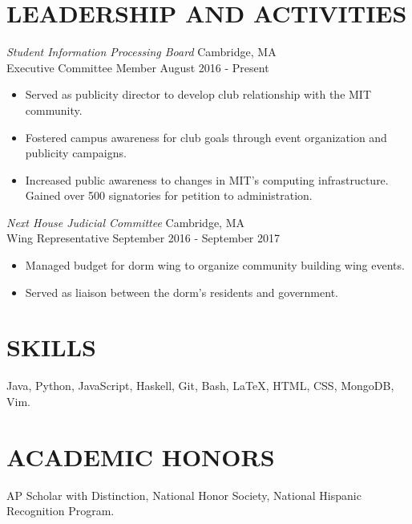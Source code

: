 \documentclass[8pt]{res}
\begin{document}
\vspace{-1em}

\section{LEADERSHIP AND ACTIVITIES}
  {\sl Student Information Processing Board}                 \hfill  Cambridge, MA\\
  Executive Committee Member                                 \hfill  August 2016 - Present
    \begin{itemize}  %
      \item Served as publicity director to develop club relationship with the MIT community.
      \item Fostered campus awareness for club goals through event organization and publicity campaigns.
      \item Increased public awareness to changes in MIT's computing infrastructure. Gained over 500 signatories for petition to administration.
    \end{itemize}
  {\sl Next House Judicial Committee}                        \hfill  Cambridge, MA\\
  Wing Representative                                        \hfill  September 2016 - September 2017
    \begin{itemize} %
      \item Managed budget for dorm wing to organize community building wing events.
      \item Served as liaison between the dorm's residents and government.
    \end{itemize}
    
\vspace{-1em}

\section{SKILLS}
  Java, Python, JavaScript, Haskell, Git, Bash, \LaTeX{}, HTML, CSS, MongoDB, Vim.
\vspace{-1em}

\section{ACADEMIC HONORS} 
  AP Scholar with Distinction, National Honor Society, National Hispanic Recognition Program.
\end{document}
